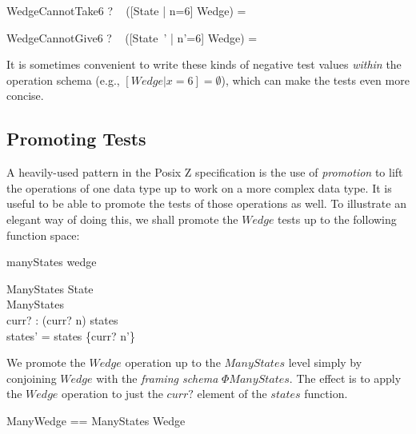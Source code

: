 \documentclass{llncs}
\begin{document}
\begin{theorem}{WedgeCannotTake6}
  \vdash? ~ ([State | n=6] \land Wedge) = \emptyset
\end{theorem}
\vspace{-5ex}
\begin{theorem}{WedgeCannotGive6}
  \vdash? ~ ([State~' | n'=6] \land Wedge) = \emptyset
\end{theorem}

It is sometimes convenient to write these kinds of negative test values
\emph{within} the operation schema (e.g., $[Wedge | x=6] = \emptyset$),
which can make the tests even more concise.


\subsection{Promoting Tests}

A heavily-used pattern in the Posix Z specification is the use of
\emph{promotion} to lift the operations of one data type up to work on a
more complex data type.  It is useful to be able to promote the tests
of those operations as well.  To illustrate an elegant way of doing this,
we shall promote the $Wedge$ tests up to the following function space:

\begin{zsection}
  \SECTION manyStates \parents wedge
\end{zsection}

\vspace{-5ex}
\begin{schema}{\Phi ManyStates}
  \Delta State \\
  \Delta ManyStates \\
  curr? : \nat
\where
  (curr? \mapsto n) \in states \\
  states' = states \oplus \{curr? \mapsto n'\}
\end{schema}

We promote the $Wedge$ operation up to the $ManyStates$ level simply by
conjoining $Wedge$ with the \emph{framing schema} $\Phi ManyStates$.
The effect is to apply the $Wedge$ operation to just the $curr?$ element of
the $states$ function. 

\begin{zed}
  ManyWedge == \Phi ManyStates \land Wedge
\end{zed}
\end{document}
